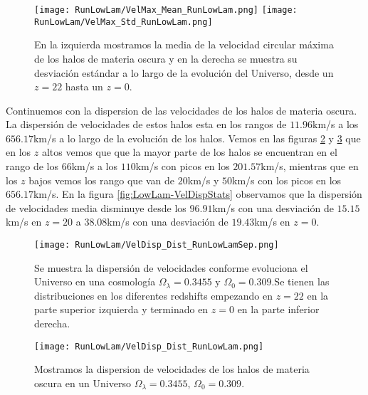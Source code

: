 \begin{figure}[H]
    \centering
    \texttt{[image: RunLowLam/VelMax\_Mean\_RunLowLam.png]}
    \texttt{[image: RunLowLam/VelMax\_Std\_RunLowLam.png]}
    \caption[Media y desviación estándar de la velocidad circular máxima de un Universo $\Omega_\lambda = 0.3455$, $\Omega_0 = 0.309$]{\footnotesize En la izquierda mostramos la media de la velocidad circular máxima de los halos de materia oscura y en la derecha se muestra su desviación estándar a lo largo de la evolución del Universo, desde un $z=22$ hasta un $z=0$.}
    \label{fig:LowLam-VelMaxStats}
\end{figure}

Continuemos con la dispersion de las velocidades de los halos de materia oscura. La dispersión de velocidades de estos halos esta en los rangos de $11.96$km/s a los $656.17$km/s a lo largo de la evolución de los halos. Vemos en las figuras \ref{fig:LowLam-VelDispDistSep} y \ref{fig:LowLam-VelDispDist} que en los $z$ altos vemos que que la mayor parte de los halos se encuentran en el rango de los $66$km/s a los $110$km/s con picos en los $201.57$km/s, mientras que en los $z$ bajos vemos los rango que van de $20$km/s y $50$km/s con los picos en los $656.17$km/s. En la figura \ref{fig:LowLam-VelDispStats} observamos que la dispersión de velocidades media disminuye desde los $96.91$km/s con una desviación de $15.15$km/s en $z=20$ a $38.08$km/s con una desviación de $19.43$km/s en $z=0$.

\begin{figure}[H]
    \centering
    \texttt{[image: RunLowLam/VelDisp\_Dist\_RunLowLamSep.png]}
    \caption[Dispersión de velocidades en la evolución de un Universo $\Omega_\lambda = 0.3455$, $\Omega_0 = 0.309$]{\footnotesize Se muestra la dispersión de velocidades conforme evoluciona el Universo en una cosmología $\Omega_\lambda = 0.3455$ y $\Omega_0 = 0.309$.Se tienen las distribuciones en los diferentes redshifts empezando en $z=22$ en la parte superior izquierda y terminado en $z=0$ en la parte inferior derecha.}
    \label{fig:LowLam-VelDispDistSep}
\end{figure}

\begin{figure}[H]
    \centering
    \texttt{[image: RunLowLam/VelDisp\_Dist\_RunLowLam.png]}
    \caption[Distribución de la dispersión de velocidades de un Universo $\Omega_\lambda = 0.3455$, $\Omega_0 = 0.309$]{\footnotesize Mostramos la dispersion de velocidades de los halos de materia oscura en un Universo $\Omega_\lambda = 0.3455$, $\Omega_0 = 0.309$.}
    \label{fig:LowLam-VelDispDist}
\end{figure}

